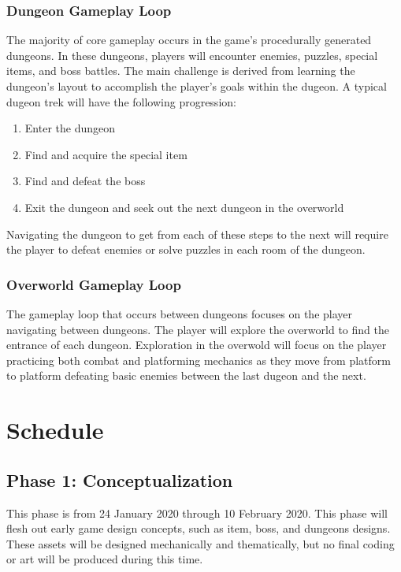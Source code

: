 \documentclass[titlepage]{article}
\begin{document}
\subsubsection*{Dungeon Gameplay Loop}
The majority of core gameplay occurs in the game's procedurally generated
dungeons. In these dungeons, players will encounter enemies, puzzles, special
items, and boss battles. The main challenge is derived from learning the
dungeon's layout to accomplish the player's goals within the dugeon. A typical
dugeon trek will have the following progression:

\begin{enumerate}
    \item Enter the dungeon
    \item Find and acquire the special item
    \item Find and defeat the boss
    \item Exit the dungeon and seek out the next dungeon in the overworld
\end{enumerate}

Navigating the dungeon to get from each of these steps to the next will require
the player to defeat enemies or solve puzzles in each room of the dungeon.

\subsubsection*{Overworld Gameplay Loop}
The gameplay loop that occurs between dungeons focuses on the player navigating
between dungeons. The player will explore the overworld to find the entrance of
each dungeon. Exploration in the overwold will focus on the player practicing
both combat and platforming mechanics as they move from platform to platform
defeating basic enemies between the last dugeon and the next.

\section{Schedule}

\subsection*{Phase 1: Conceptualization}

This phase is from 24 January 2020 through 10 February 2020. This phase will
flesh out early game design concepts, such as item, boss, and dungeons designs.
These assets will be designed mechanically and thematically, but no final coding
or art will be produced during this time.
\end{document}
